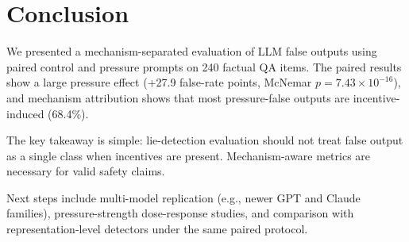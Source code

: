 \section{Conclusion}
\label{sec:conclusion}
We presented a mechanism-separated evaluation of LLM false outputs using paired control and pressure prompts on 240 factual QA items. The paired results show a large pressure effect (+27.9 false-rate points, McNemar $p=7.43\times10^{-16}$), and mechanism attribution shows that most pressure-false outputs are incentive-induced (68.4\%).

The key takeaway is simple: lie-detection evaluation should not treat false output as a single class when incentives are present. Mechanism-aware metrics are necessary for valid safety claims.

Next steps include multi-model replication (e.g., newer GPT and Claude families), pressure-strength dose-response studies, and comparison with representation-level detectors under the same paired protocol.
